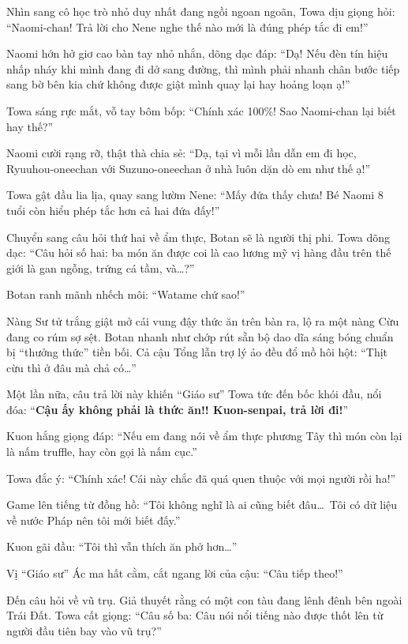 \documentclass[../main.tex]{subfiles}
\begin{document}

Nhìn sang cô học trò nhỏ duy nhất đang ngồi ngoan ngoãn, Towa dịu giọng hỏi: ``Naomi-chan! Trả lời cho Nene nghe thế nào mới là đúng phép tắc đi em!''

Naomi hớn hở giơ cao bàn tay nhỏ nhắn, dõng dạc đáp: ``Dạ! Nếu đèn tín hiệu nhấp nháy khi mình đang đi dở sang đường, thì mình phải nhanh chân bước tiếp sang bờ bên kia chứ không được giật mình quay lại hay hoảng loạn ạ!''

Towa sáng rực mắt, vỗ tay bôm bốp: ``Chính xác 100\%! Sao Naomi-chan lại biết hay thế?''

Naomi cười rạng rỡ, thật thà chia sẻ: ``Dạ, tại vì mỗi lần dẫn em đi học, Ryuuhou-oneechan với Suzuno-oneechan ở nhà luôn dặn dò em như thế ạ!''

Towa gật đầu lia lịa, quay sang lườm Nene: ``Mấy đứa thấy chưa! Bé Naomi 8 tuổi còn hiểu phép tắc hơn cả hai đứa đấy!''

Chuyển sang câu hỏi thứ hai về ẩm thực, Botan sẽ là người thị phi. Towa dõng dạc: ``Câu hỏi số hai: ba món ăn được coi là cao lương mỹ vị hàng đầu trên thế giới là gan ngỗng, trứng cá tầm, và\dots?''

Botan ranh mãnh nhếch môi: ``Watame chứ sao!''


Nàng Sư tử trắng giật mở cái vung đậy thức ăn trên bàn ra, lộ ra một nàng Cừu đang co rúm sợ sệt. Botan nhanh như chớp rút sẵn bộ dao dĩa sáng bóng chuẩn bị ``thưởng thức'' tiền bối. Cả cậu Tổng lẫn trợ lý ảo đều đổ mồ hôi hột: ``Thịt cừu thì ở đâu mà chả có\dots''

Một lần nữa, câu trả lời này khiến ``Giáo sư'' Towa tức đến bốc khói đầu, nổi đóa: ``\textbf{Cậu ấy không phải là thức ăn!! Kuon-senpai, trả lời đi!}''

Kuon hắng giọng đáp: ``Nếu em đang nói về ẩm thực phương Tây thì món còn lại là nấm truffle, hay còn gọi là nấm cục.''

Towa đắc ý: ``Chính xác! Cái này chắc đã quá quen thuộc với mọi người rồi ha!''

Game lên tiếng từ đồng hồ: ``Tôi không nghĩ là ai cũng biết đâu\dots\ Tôi có dữ liệu về nước Pháp nên tôi mới biết đấy.''

Kuon gãi đầu: ``Tôi thì vẫn thích ăn phở hơn\dots''

Vị ``Giáo sư'' Ác ma hất cằm, cắt ngang lời của cậu: ``Câu tiếp theo!''

Đến câu hỏi về vũ trụ. Giả thuyết rằng có một con tàu đang lênh đênh bên ngoài Trái Đất. Towa cất giọng: ``Câu số ba: Câu nói nổi tiếng nào được thốt lên từ người đầu tiên bay vào vũ trụ?''
\end{document}
